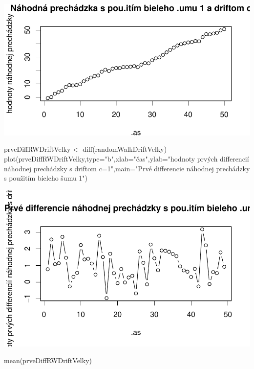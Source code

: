 \documentclass[
  letterpaper,
  DIV=11,
  numbers=noendperiod]{scrreprt}
\newenvironment{Shaded}{\begin{snugshade}}{\end{snugshade}}
\newcommand{\AttributeTok}[1]{\textcolor[rgb]{0.40,0.45,0.13}{#1}}
\newcommand{\FunctionTok}[1]{\textcolor[rgb]{0.28,0.35,0.67}{#1}}
\newcommand{\NormalTok}[1]{\textcolor[rgb]{0.00,0.23,0.31}{#1}}
\newcommand{\OtherTok}[1]{\textcolor[rgb]{0.00,0.23,0.31}{#1}}
\newcommand{\StringTok}[1]{\textcolor[rgb]{0.13,0.47,0.30}{#1}}
\begin{document}
\includegraphics{prednaska3_NahodnaPrechadzkaStacionarita_files/figure-pdf/unnamed-chunk-11-1.pdf}

\begin{Shaded}
\begin{Highlighting}[]
\NormalTok{prveDiffRWDriftVelky }\OtherTok{\textless{}{-}} \FunctionTok{diff}\NormalTok{(randomWalkDriftVelky)}
\FunctionTok{plot}\NormalTok{(prveDiffRWDriftVelky,}\AttributeTok{type=}\StringTok{"b"}\NormalTok{,}\AttributeTok{xlab=}\StringTok{"čas"}\NormalTok{,}\AttributeTok{ylab=}\StringTok{"hodnoty prvých differencií náhodnej prechádzky s driftom c=1"}\NormalTok{,}\AttributeTok{main=}\StringTok{"Prvé differencie náhodnej prechádzky s použitím bieleho šumu 1"}\NormalTok{)}
\end{Highlighting}
\end{Shaded}

\includegraphics{prednaska3_NahodnaPrechadzkaStacionarita_files/figure-pdf/unnamed-chunk-11-2.pdf}

\begin{Shaded}
\begin{Highlighting}[]
\FunctionTok{mean}\NormalTok{(prveDiffRWDriftVelky)}
\end{Highlighting}
\end{Shaded}
\end{document}
